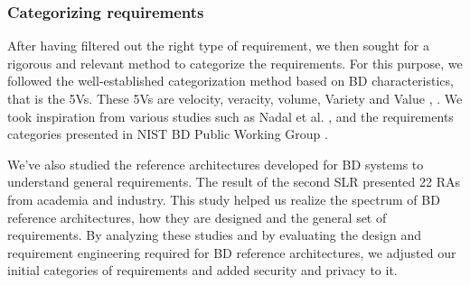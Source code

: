 \documentclass{bmcart}
\begin{document}
\subsubsection{Categorizing requirements} After having filtered out the right type of requirement, we then sought for a rigorous and relevant method to categorize the requirements. For this purpose, we followed the well-established categorization method based on BD characteristics, that is the 5Vs. These 5Vs are velocity, veracity, volume, Variety and Value \cite{Bughin2016}, \cite{rad2017big}. We took inspiration from various studies such as Nadal et al. \cite{nadal2017software}, and the requirements categories presented in NIST BD Public Working Group \cite{Chang.2019}.



We've also studied the reference architectures developed for BD systems to understand general requirements. The result of the second SLR presented 22 RAs from academia and industry. This study helped us realize the spectrum of BD reference architectures, how they are designed and the general set of requirements. By analyzing these studies and by evaluating the design and requirement engineering required for BD reference architectures, we adjusted our initial categories of requirements and added security and privacy to it. 
\end{document}
